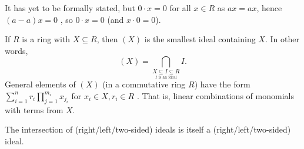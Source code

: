 \begin{remark}
	It has yet to be formally stated, but \(0 \cdot x = 0\) for all \(x \in R\) as \(ax = ax\), hence \(\left( a - a \right) x = 0\) , so \(0 \cdot x = 0\) (and \(x \cdot 0 = 0\)).
\end{remark}
\begin{definition}
	If \(R\) is a ring with \(X \subseteq R\), then \(\left( X \right) \) is the smallest ideal containing \(X\). In other words, \[
		\left( X \right) = \bigcap_{\underset{I \text{ is an ideal}}{X \subseteq I \subseteq R}} I
	.\]
	General elements of \(\left( X \right) \) (in a commutative ring \(R\)) have the form \(\sum_{i=1}^{n} r_{i}\prod_{j=1}^{m_{i}} x_{j_{i}}  \) for \(x_{i} \in X, r_{i} \in R\) . That is, linear combinations of monomials with terms from \(X\).
\end{definition}
\begin{remark}
	The intersection of (right/left/two-sided) ideals is itself a (right/left/two-sided) ideal.
\end{remark}
